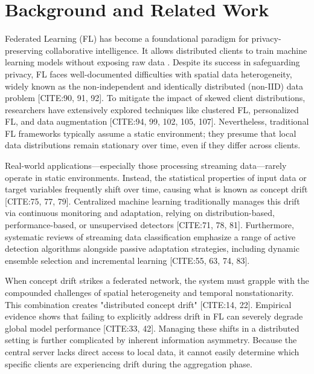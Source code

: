 \documentclass[journal]{IEEEtran}
\begin{document}
\section{Background and Related Work}
\label{sec:background}

Federated Learning (FL) has become a foundational paradigm for privacy-preserving collaborative intelligence. It allows distributed clients to train machine learning models without exposing raw data \cite{Collins2025}. Despite its success in safeguarding privacy, FL faces well-documented difficulties with spatial data heterogeneity, widely known as the non-independent and identically distributed (non-IID) data problem [CITE:90, 91, 92]. To mitigate the impact of skewed client distributions, researchers have extensively explored techniques like clustered FL, personalized FL, and data augmentation [CITE:94, 99, 102, 105, 107]. Nevertheless, traditional FL frameworks typically assume a static environment; they presume that local data distributions remain stationary over time, even if they differ across clients.

Real-world applications—especially those processing streaming data—rarely operate in static environments. Instead, the statistical properties of input data or target variables frequently shift over time, causing what is known as concept drift [CITE:75, 77, 79]. Centralized machine learning traditionally manages this drift via continuous monitoring and adaptation, relying on distribution-based, performance-based, or unsupervised detectors [CITE:71, 78, 81]. Furthermore, systematic reviews of streaming data classification emphasize a range of active detection algorithms alongside passive adaptation strategies, including dynamic ensemble selection and incremental learning [CITE:55, 63, 74, 83].

When concept drift strikes a federated network, the system must grapple with the compounded challenges of spatial heterogeneity and temporal nonstationarity. This combination creates "distributed concept drift" [CITE:14, 22]. Empirical evidence shows that failing to explicitly address drift in FL can severely degrade global model performance [CITE:33, 42]. Managing these shifts in a distributed setting is further complicated by inherent information asymmetry. Because the central server lacks direct access to local data, it cannot easily determine which specific clients are experiencing drift during the aggregation phase.
\end{document}
